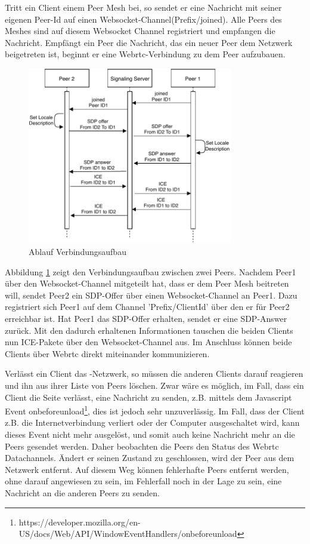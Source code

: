 Tritt ein Client einem Peer Mesh bei, so sendet er eine Nachricht mit seiner eigenen Peer-Id auf einen Websocket-Channel({Prefix}/joined). Alle Peers des Meshes sind auf diesem Websocket Channel registriert und empfangen die Nachricht. Empfängt ein Peer die Nachricht, das ein neuer Peer dem Netzwerk beigetreten ist, beginnt er eine Webrtc-Verbindung zu dem Peer aufzubauen.

\begin{figure}[!h]
	\centering
	\includegraphics[width=0.8\textwidth]{figures/Signaling-Webrtc}
	\caption[Ablauf Verbindungsaufbau]{Ablauf Verbindungsaufbau}
	\label{fig:signaling-connection}
\end{figure}

Abbildung \ref{fig:signaling-connection} zeigt den Verbindungsaufbau zwischen zwei Peers. Nachdem Peer1 über den Websocket-Channel mitgeteilt hat, dass er dem Peer Mesh beitreten will, sendet Peer2 ein SDP-Offer über einen Websocket-Channel an Peer1. Dazu registriert sich Peer1 auf dem Channel '{Prefix}/{ClientId}' über den er für Peer2 erreichbar ist. Hat Peer1 das SDP-Offer erhalten, sendet er eine SDP-Answer zurück. Mit den dadurch erhaltenen Informationen tauschen die beiden Clients nun ICE-Pakete über den Websocket-Channel aus. Im Anschluss können beide Clients über Webrtc direkt miteinander kommunizieren.

Verlässt ein Client das \pTp-Netzwerk, so müssen die anderen Clients darauf reagieren und ihn aus ihrer Liste von Peers löschen. Zwar wäre es möglich, im Fall, dass ein Client die Seite verlässt, eine Nachricht zu senden, z.B. mittels dem Javascript Event onbeforeunload\footnote{https://developer.mozilla.org/en-US/docs/Web/API/WindowEventHandlers/onbeforeunload}, dies ist jedoch sehr unzuverlässig. Im Fall, dass der Client z.B. die Internetverbindung verliert oder der Computer ausgeschaltet wird, kann dieses Event nicht mehr ausgelöst, und somit auch keine Nachricht mehr an die Peers gesendet werden. Daher beobachten die Peers den Status des Webrtc Datachannels. Ändert er seinen Zustand zu geschlossen, wird der Peer aus dem Netzwerk entfernt. Auf diesem Weg können fehlerhafte Peers entfernt werden, ohne darauf angewiesen zu sein, im Fehlerfall noch in der Lage zu sein, eine Nachricht an die anderen Peers zu senden.

